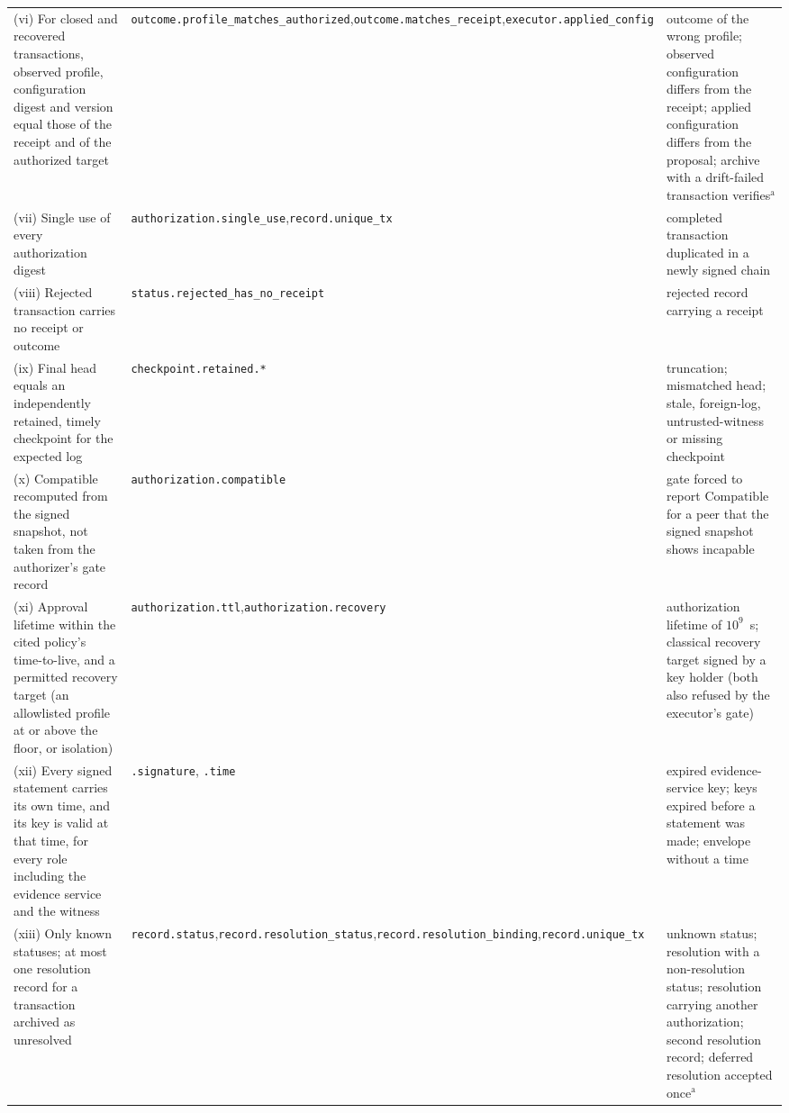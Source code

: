 \documentclass[journal]{IEEEtran}
\newcommand{\Compatible}{\mathrm{Compatible}}
\newcommand{\code}[1]{\texttt{\footnotesize #1}}
\begin{document}
\begin{table}[!t]
\begin{tabular}{>{\raggedright\arraybackslash}p{4.5cm}>{\raggedright\arraybackslash}p{6.4cm}>{\raggedright\arraybackslash}p{5.5cm}}
(vi) For closed and recovered transactions, observed profile, configuration digest and version equal those of the receipt and of the authorized target & \code{outcome.profile\_matches\_authorized},\newline \code{outcome.matches\_receipt},\newline \code{executor.applied\_config} & outcome of the wrong profile; observed configuration differs from the receipt; applied configuration differs from the proposal; archive with a drift-failed transaction verifies$^{\mathrm{a}}$ \\
(vii) Single use of every authorization digest & \code{authorization.single\_use},\newline \code{record.unique\_tx} & completed transaction duplicated in a newly signed chain \\
(viii) Rejected transaction carries no receipt or outcome & \code{status.rejected\_has\_no\_receipt} & rejected record carrying a receipt \\
(ix) Final head equals an independently retained, timely checkpoint for the expected log & \code{checkpoint.retained.*} & truncation; mismatched head; stale, foreign-log, untrusted-witness or missing checkpoint \\
(x) $\Compatible$ recomputed from the signed snapshot, not taken from the authorizer's gate record & \code{authorization.compatible} & gate forced to report $\Compatible$ for a peer that the signed snapshot shows incapable \\
(xi) Approval lifetime within the cited policy's time-to-live, and a permitted recovery target (an allowlisted profile at or above the floor, or isolation) & \code{authorization.ttl},\newline \code{authorization.recovery} & authorization lifetime of $10^{9}$~s; classical recovery target signed by a key holder (both also refused by the executor's gate) \\
(xii) Every signed statement carries its own time, and its key is valid at that time, for every role including the evidence service and the witness & \code{*.signature}, \code{*.time} & expired evidence-service key; keys expired before a statement was made; envelope without a time \\
(xiii) Only known statuses; at most one resolution record for a transaction archived as unresolved & \code{record.status},\newline \code{record.resolution\_status},\newline \code{record.resolution\_binding},\newline \code{record.unique\_tx} & unknown status; resolution with a non-resolution status; resolution carrying another authorization; second resolution record; deferred resolution accepted once$^{\mathrm{a}}$ \\

\end{tabular}
\end{table}
\end{document}
